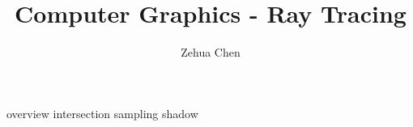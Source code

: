 \documentclass[letterpaper, 11pt]{report}
\title{Computer Graphics - Ray Tracing}
\author{Zehua Chen}
\begin{document}
  \maketitle
  \tableofcontents

  {overview}
  {intersection}
  {sampling}
  {shadow}

  \newpage
  \printglossary
\end{document}
